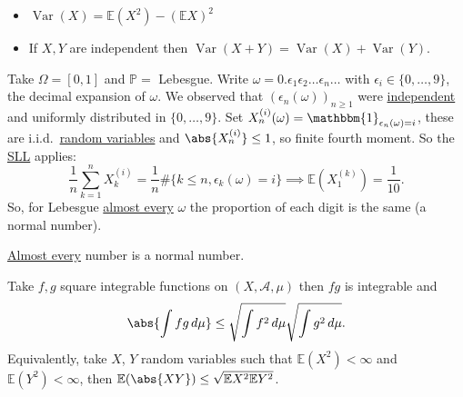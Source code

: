 \documentclass{article}
\newcommand{\1}[1]{\mathbbm{1}_{#1}}
\DeclareMathOperator{\Var}{Var}
\begin{document}
\begin{remark}\leavevmode
    \begin{itemize}
        \item $\Var(X) = \mathbb{E}(X^2) - (\mathbb{E}X)^2$
        \item If $X, Y$ are independent then $\Var(X + Y) = \Var(X) + \Var(Y)$.
    \end{itemize}
\end{remark}


\begin{eg}
    Take $\Omega = [0, 1]$ and $\mathbb{P} = $ Lebesgue.
    Write $\omega = 0.\epsilon_1 \epsilon_2 \dotsc \epsilon_n \dotsc$ with $\epsilon_i \in \{0, \dotsc, 9\}$, the decimal expansion of $\omega$.
    We observed that $(\epsilon_n(\omega))_{n \geq 1}$ were \hyperlink{def:indepRV}{independent} and uniformly distributed in $\{0, \dotsc, 9\}$.
    Set $X_n^{(i)} (\omega) = \1{\epsilon_n(\omega) = i}$, these are i.i.d.\ \hyperlink{def:rv}{random variables} and $\abs{X_n^{(i)}} \leq 1$, so finite fourth moment.
    So the \hyperlink{thm:sll}{SLL} applies:
    \begin{equation*}
        \frac{1}{n} \sum_{k=1}^n X_k^{(i)} = \frac{1}{n} \# \{k \leq n, \epsilon_k(\omega) = i\} \implies \mathbb{E}(X_1^{(k)}) = \frac{1}{10}.
    \end{equation*}
    So, for Lebesgue \hyperlink{def:ae}{almost every} $\omega$ the proportion of each digit is the same (a normal number).
\end{eg}
\begin{thm}[Borel]
    \hyperlink{def:ae}{Almost every} number is a normal number.
\end{thm}

\begin{lemma}
    Take $f, g$ square integrable functions on $(X, \mathcal{A}, \mu)$ then $fg$ is integrable and
    \begin{equation*}
        \abs{\int fg \, d\mu} \leq \sqrt{\int f^2 \, d\mu} \sqrt{\int g^2 \, d \mu}.
    \end{equation*}
    Equivalently, take $X$, $Y$ random variables such that $\mathbb{E}(X^2) < \infty$ and $\mathbb{E}(Y^2) < \infty$, then $\mathbb{E}(\abs{XY}) \leq \sqrt{\mathbb{E}X^2 \mathbb{E}Y^2}$.
\end{lemma}
\end{document}
